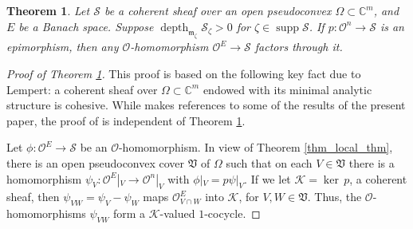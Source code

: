\documentclass{amsart}
\numberwithin{equation}{section}
\theoremstyle{definition}
\theoremstyle{plain}
\newtheorem{theorem}[definition]{Theorem}
\theoremstyle{remark}
\begin{document}
\begin{theorem}\label{thm_coh_global}
Let ${\ensuremath{\mathcal{{S}}}}$ be a coherent sheaf over an open pseudoconvex 
$\Omega\subset\mathbb{C}^m$, and $E$ be a Banach space.
Suppose 
 ${\mathop{\mathrm{depth}}\nolimits _{{{{\mathop{\mathfrak{m}}}}_\zeta}}}{\ensuremath{\mathcal{{S}}}}_\zeta>0$ 
for
$\zeta\in{\mathop{\mathrm{supp}}} {\ensuremath{\mathcal{{S}}}}$.  
If $p:{\ensuremath{\mathcal{{O}}}}^n\rightarrow{\ensuremath{\mathcal{{S}}}}$
is an epimorphism, then any ${\ensuremath{\mathcal{{O}}}}$-homomorphism ${\ensuremath{\mathcal{{O}}}}^E\rightarrow{\ensuremath{\mathcal{{S}}}}$ 
factors through it.
\end{theorem}
\begin{proof}[Proof of Theorem \ref{thm_coh_global}]
This proof is based on the following key fact \cite[Theorem 4.3]{Lempert} due to
Lempert:
a coherent sheaf over $\Omega\subset\mathbb{C}^m$ endowed with its minimal 
analytic structure is cohesive. While \cite{Lempert} makes references to some
of the results of the present paper,  
the proof of \cite[Theorem 4.3]{Lempert} is 
independent of Theorem \ref{thm_coh_global}.

Let $\phi:{\ensuremath{\mathcal{{O}}}}^E\rightarrow{\ensuremath{\mathcal{{S}}}}$ be an ${\ensuremath{\mathcal{{O}}}}$-homomorphism.
In view of Theorem \ref{thm_local_thm}, there is an open pseudoconvex cover $\mathfrak{V}$ of $\Omega$
such that on each $V\in\mathfrak{V}$ there is a homomorphism 
$\psi_V:{\ensuremath{\mathcal{{O}}}}^E|_V\rightarrow {\ensuremath{\mathcal{{O}}}}^n|_V$ with $\phi|_V=p\psi|_V$.
If we let ${\ensuremath{\mathcal{{K}}}}={{\mathop{\mathrm{ker\,}}}} p$, a coherent sheaf,
then $\psi_{VW}=\psi_V-\psi_W$ maps ${\ensuremath{\mathcal{{O}}}}^E_{V\cap W}$
into ${\ensuremath{\mathcal{{K}}}}$, for $V,W\in\mathfrak{V}$.
Thus, the ${\ensuremath{\mathcal{{O}}}}$-homomorphisms $\psi_{VW}$ form a ${\ensuremath{\mathcal{{K}}}}$-valued
$1$-cocycle.


\end{proof}
\end{document}
